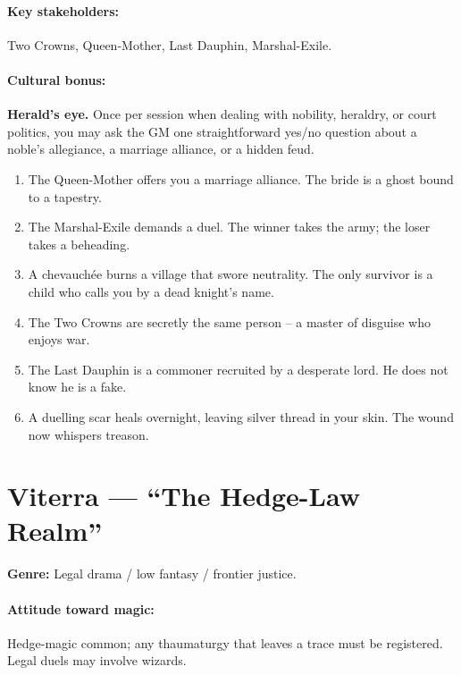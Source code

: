 \paragraph{Key stakeholders:} Two Crowns, Queen-Mother, Last Dauphin, Marshal-Exile.

\paragraph{Cultural bonus:} \textbf{Herald's eye.} Once per session when dealing with nobility, heraldry, or court politics, you may ask the GM one straightforward yes/no question about a noble's allegiance, a marriage alliance, or a hidden feud.

\begin{tcolorbox}[colback=gray!5!white, colframe=gray!70!black, title=Vhasia Mini-Generator (d6),breakable]
\begin{enumerate}
\item The Queen-Mother offers you a marriage alliance. The bride is a ghost bound to a tapestry.
\item The Marshal-Exile demands a duel. The winner takes the army; the loser takes a beheading.
\item A chevauchée burns a village that swore neutrality. The only survivor is a child who calls you by a dead knight's name.
\item The Two Crowns are secretly the same person -- a master of disguise who enjoys war.
\item The Last Dauphin is a commoner recruited by a desperate lord. He does not know he is a fake.
\item A duelling scar heals overnight, leaving silver thread in your skin. The wound now whispers treason.
\end{enumerate}
\end{tcolorbox}

\section{Viterra --- ``The Hedge-Law Realm''}
\textbf{Genre:} Legal drama / low fantasy / frontier justice.

\paragraph{Attitude toward magic:} Hedge-magic common; any thaumaturgy that leaves a trace must be registered. Legal duels may involve wizards.

